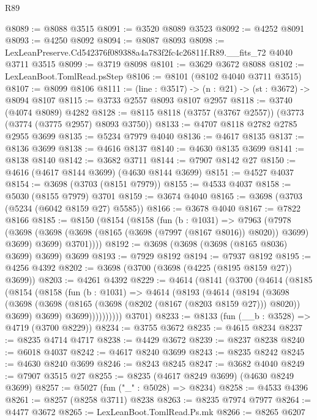 \begin{lexlean}{R89}
\begin{coremodule}
@8089 := @8088 @3515
@8091 := @3520 @8089 @3523
@8092 := @4252 @8091
@8093 := @4250 @8092
@8094 := @8087 @8093
@8098 := LexLeanPreserve.Cd542376f089388a4a783f2fc4c26811f.R89.__fits_72 @4040 @3711 @3515
@8099 := @3719 @8098
@8101 := @3629 @3672 @8088
@8102 := LexLeanBoot.TomlRead.psStep
@8106 := @8101 (@8102 @4040 @3711 @3515)
@8107 := @8099 @8106
@8111 := (line : @3517) -> (n : @21) -> (st : @3672) -> @8094 @8107
@8115 := @3733 @2557 @8093 @8107 @2957
@8118 := @3740 (@4074 @8089) @4282
@8128 := @8115 @8118 (@3757 (@3767 @2557)) (@3773 (@3774 (@3775 @2957) @8093 @3750))
@8133 := @4707 @8118 @2782 @2785 @2955 @3699
@8135 := @5234 @7979 @4040
@8136 := @4617 @8135
@8137 := @8136 @3699
@8138 := @4616 @8137
@8140 := @4630 @8135 @3699
@8141 := @8138 @8140
@8142 := @3682 @3711
@8144 := @7907 @8142 @27
@8150 := @4616 (@4617 @8144 @3699) (@4630 @8144 @3699)
@8151 := @4527 @4037
@8154 := @3698 (@3703 (@8151 @7979))
@8155 := @4533 @4037
@8158 := @5030 (@8155 @7979) @3701
@8159 := @3674 @4040
@8165 := @3698 (@3703 (@5234 (@6042 @8159 @27) @5585))
@8166 := @3678 @4040
@8167 := @7822 @8166
@8185 := @8150
    (@8154
      (@8158
        (fun (b : @1031) =>
        @7963
          (@7978
            (@3698 (@3698 (@3698 (@8165 (@3698 (@7997 (@8167 @8016)) @8020)) @3699) @3699) @3699)
            @3701))))
@8192 := @3698 (@3698 (@3698 (@8165 @8036) @3699) @3699) @3699
@8193 := @7929 @8192
@8194 := @7937 @8192
@8195 := @4256 @4392
@8202 := @3698 (@3700 (@3698 (@4225 (@8195 @8159 @27)) @3699))
@8203 := @4261 @4392
@8229 := @4614
    (@8141
      (@3700
        (@4614
          (@8185
            (@8154
              (@8158
                (fun (b : @1031) =>
                @4614
                  (@8193
                    (@4614
                      (@8194
                        (@3698
                          (@3698
                            (@3698 (@8165 (@3698 (@8202 (@8167 (@8203 @8159 @27))) @8020)) @3699)
                            @3699)
                          @3699))))))))))
      @3701)
@8233 := @8133 (fun (__b : @3528) => @4719 (@3700 @8229))
@8234 := @3755 @3672
@8235 := @4615 @8234
@8237 := @8235 @4714 @4717
@8238 := @4429 @3672
@8239 := @8237 @8238
@8240 := @6018 @4037
@8242 := @4617 @8240 @3699
@8243 := @8235 @8242
@8245 := @4630 @8240 @3699
@8246 := @8243 @8245
@8247 := @3682 @4040
@8249 := @7907 @3515 @27
@8255 := @8235 (@4617 @8249 @3699) (@4630 @8249 @3699)
@8257 := @5027 (fun ("_" : @5028) => @8234)
@8258 := @4533 @4396
@8261 := @8257 (@8258 @3711) @8238
@8263 := @8235 @7974 @7977
@8264 := @4477 @3672
@8265 := LexLeanBoot.TomlRead.Ps.mk
@8266 := @8265 @6207

\end{coremodule}
\end{lexlean}
